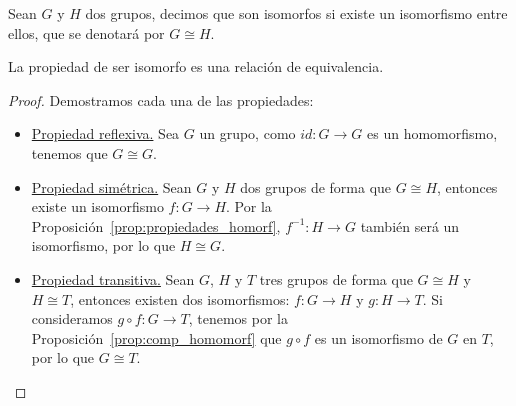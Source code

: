 \begin{definicion}
    Sean $G$ y $H$ dos grupos, decimos que son isomorfos si existe un isomorfismo entre ellos, que se denotará por $G\cong H$.
\end{definicion}

\begin{prop}
    La propiedad de ser isomorfo es una relación de equivalencia.
    \begin{proof}
        Demostramos cada una de las propiedades:
        \begin{itemize}
            \item \underline{Propiedad reflexiva.} Sea $G$ un grupo, como $id:G\to G$ es un homomorfismo, tenemos que $G\cong G$.
            \item \underline{Propiedad simétrica.} Sean $G$ y $H$ dos grupos de forma que $G\cong H$, entonces existe un isomorfismo $f:G\to H$. Por la Proposición~\ref{prop:propiedades_homorf}, $f^{-1}:H\to G$ también será un isomorfismo, por lo que $H \cong G$.
            \item \underline{Propiedad transitiva.} Sean $G$, $H$ y $T$ tres grupos de forma que $G\cong H$ y $H\cong T$, entonces existen dos isomorfismos: $f:G\to H$ y $g:H\to T$. Si consideramos $g\circ f:G\to T$, tenemos por la Proposición~\ref{prop:comp_homomorf} que $g\circ f$ es un isomorfismo de $G$ en $T$, por lo que $G\cong T$.
        \end{itemize}
    \end{proof}
\end{prop}

